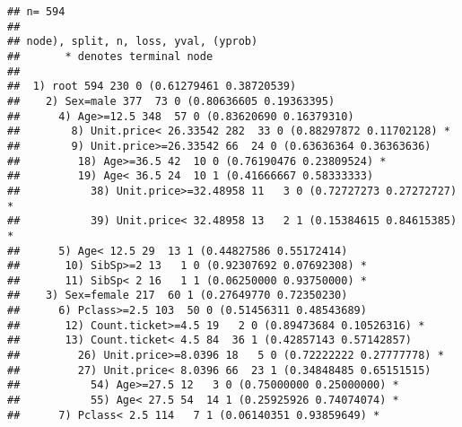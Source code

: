 \documentclass[
]{article}
\newenvironment{Shaded}{\begin{snugshade}}{\end{snugshade}}
\newcommand{\DataTypeTok}[1]{\textcolor[rgb]{0.13,0.29,0.53}{#1}}
\newcommand{\DecValTok}[1]{\textcolor[rgb]{0.00,0.00,0.81}{#1}}
\newcommand{\FloatTok}[1]{\textcolor[rgb]{0.00,0.00,0.81}{#1}}
\newcommand{\KeywordTok}[1]{\textcolor[rgb]{0.13,0.29,0.53}{\textbf{#1}}}
\newcommand{\NormalTok}[1]{#1}
\newcommand{\OperatorTok}[1]{\textcolor[rgb]{0.81,0.36,0.00}{\textbf{#1}}}
\newcommand{\StringTok}[1]{\textcolor[rgb]{0.31,0.60,0.02}{#1}}
\begin{document}
\texttt{}

\begin{Shaded}
\end{Shaded}

\begin{verbatim}
## n= 594 
## 
## node), split, n, loss, yval, (yprob)
##       * denotes terminal node
## 
##  1) root 594 230 0 (0.61279461 0.38720539)  
##    2) Sex=male 377  73 0 (0.80636605 0.19363395)  
##      4) Age>=12.5 348  57 0 (0.83620690 0.16379310)  
##        8) Unit.price< 26.33542 282  33 0 (0.88297872 0.11702128) *
##        9) Unit.price>=26.33542 66  24 0 (0.63636364 0.36363636)  
##         18) Age>=36.5 42  10 0 (0.76190476 0.23809524) *
##         19) Age< 36.5 24  10 1 (0.41666667 0.58333333)  
##           38) Unit.price>=32.48958 11   3 0 (0.72727273 0.27272727) *
##           39) Unit.price< 32.48958 13   2 1 (0.15384615 0.84615385) *
##      5) Age< 12.5 29  13 1 (0.44827586 0.55172414)  
##       10) SibSp>=2 13   1 0 (0.92307692 0.07692308) *
##       11) SibSp< 2 16   1 1 (0.06250000 0.93750000) *
##    3) Sex=female 217  60 1 (0.27649770 0.72350230)  
##      6) Pclass>=2.5 103  50 0 (0.51456311 0.48543689)  
##       12) Count.ticket>=4.5 19   2 0 (0.89473684 0.10526316) *
##       13) Count.ticket< 4.5 84  36 1 (0.42857143 0.57142857)  
##         26) Unit.price>=8.0396 18   5 0 (0.72222222 0.27777778) *
##         27) Unit.price< 8.0396 66  23 1 (0.34848485 0.65151515)  
##           54) Age>=27.5 12   3 0 (0.75000000 0.25000000) *
##           55) Age< 27.5 54  14 1 (0.25925926 0.74074074) *
##      7) Pclass< 2.5 114   7 1 (0.06140351 0.93859649) *
\end{verbatim}

\begin{Shaded}
\end{Shaded}
\end{document}
